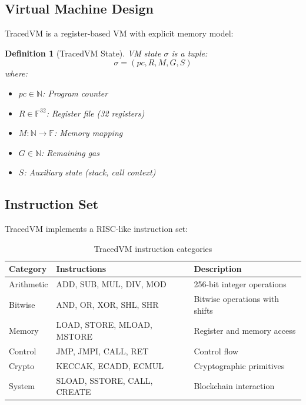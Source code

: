 \documentclass[11pt,a4paper]{article}
\newtheorem{definition}{Definition}
\begin{document}
\subsection{Virtual Machine Design}

TracedVM is a register-based VM with explicit memory model:

\begin{definition}[TracedVM State]
VM state $\sigma$ is a tuple:
\begin{equation}
    \sigma = (pc, R, M, G, S)
\end{equation}
where:
\begin{itemize}
    \item $pc \in \mathbb{N}$: Program counter
    \item $R \in \mathbb{F}^{32}$: Register file (32 registers)
    \item $M: \mathbb{N} \to \mathbb{F}$: Memory mapping
    \item $G \in \mathbb{N}$: Remaining gas
    \item $S$: Auxiliary state (stack, call context)
\end{itemize}
\end{definition}

\subsection{Instruction Set}

TracedVM implements a RISC-like instruction set:

\begin{table}[h]
\centering
\begin{tabular}{llp{6cm}}
\toprule
\textbf{Category} & \textbf{Instructions} & \textbf{Description} \\
\midrule
Arithmetic & ADD, SUB, MUL, DIV, MOD & 256-bit integer operations \\
Bitwise & AND, OR, XOR, SHL, SHR & Bitwise operations with shifts \\
Memory & LOAD, STORE, MLOAD, MSTORE & Register and memory access \\
Control & JMP, JMPI, CALL, RET & Control flow \\
Crypto & KECCAK, ECADD, ECMUL & Cryptographic primitives \\
System & SLOAD, SSTORE, CALL, CREATE & Blockchain interaction \\
\bottomrule
\end{tabular}
\caption{TracedVM instruction categories}
\end{table}
\end{document}
